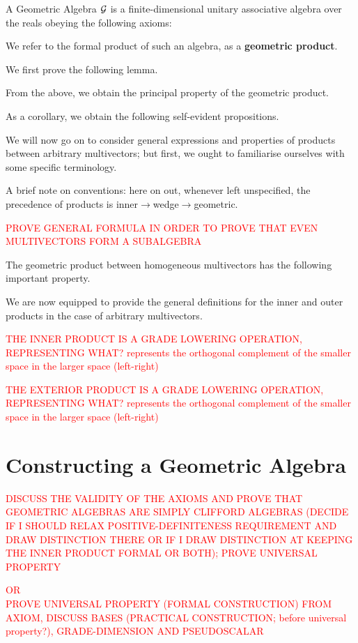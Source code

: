 A Geometric Algebra $\mathcal{G}$  is a finite-dimensional unitary associative algebra over the reals obeying the following axioms:

We refer to the formal product of such an algebra, as a \textbf{geometric product}.

We first prove the following lemma.



From the above, we obtain the principal property of the geometric product.



As a corollary, we obtain the following self-evident propositions.



We will now go on to consider general expressions and properties of products between arbitrary multivectors; but first, we ought to familiarise ourselves with some specific terminology.

A brief note on conventions: here on out, whenever left unspecified, the precedence of products is inner$\to$wedge$\to$geometric.

\textcolor{red}{PROVE GENERAL FORMULA IN ORDER TO PROVE THAT EVEN MULTIVECTORS FORM A SUBALGEBRA}

The geometric product between homogeneous multivectors has the following important property.

%




We are now equipped to provide the general definitions for the inner and outer products in the case of arbitrary multivectors.


\textcolor{red}{THE INNER PRODUCT IS A GRADE LOWERING OPERATION, REPRESENTING WHAT? represents the orthogonal complement of the smaller space in the larger space (left-right)}



\textcolor{red}{THE EXTERIOR PRODUCT IS A GRADE LOWERING OPERATION, REPRESENTING WHAT? represents the orthogonal complement of the smaller space in the larger space (left-right)}

\newpage

\section{Constructing a Geometric Algebra}

\textcolor{red}{DISCUSS THE VALIDITY OF THE AXIOMS AND PROVE THAT GEOMETRIC ALGEBRAS ARE SIMPLY CLIFFORD ALGEBRAS (DECIDE IF I SHOULD RELAX POSITIVE-DEFINITENESS REQUIREMENT AND DRAW DISTINCTION THERE OR IF I DRAW DISTINCTION AT KEEPING THE INNER PRODUCT FORMAL OR BOTH); PROVE UNIVERSAL PROPERTY}

\textcolor{red}{OR \\ PROVE UNIVERSAL PROPERTY (FORMAL CONSTRUCTION) FROM AXIOM, DISCUSS BASES (PRACTICAL CONSTRUCTION; before universal property?), GRADE-DIMENSION AND PSEUDOSCALAR}


